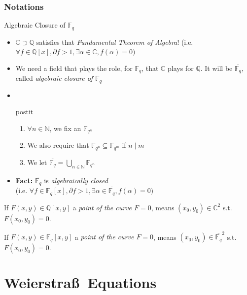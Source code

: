 \documentclass[10pt,handout]{beamer} %
\newcommand{\Q}{\mathbb Q}
\newcommand{\N}{\mathbb N}
\newcommand{\F}{\mathbb F}
\newcommand{\C}{\mathbb C}
\theoremstyle{definition}
\begin{document}
\begin{frame}[label=current]
\frametitle{Notations}
%
 \begin{block}{Algebraic Closure of $\F_q$}\pause
 \begin{itemize}[<+-| alert@+>] %
  \item $\C\supset\Q$ satisfies that \emph{Fundamental Theorem of Algebra}! (i.e. $\forall f\in\Q[x], \partial f>1, \exists\alpha\in\C,
 f(\alpha)=0)$
  \item We need a field that plays the role, for $\F_q$, that $\C$ plays for $\Q$. It will be $\overline{\F_q}$, called
\emph{algebraic closure of $\F_q$}
 \item[] \ \hfil 
 \begin{beamercolorbox}[rounded=true,shadow=true,wd=6.5cm]{postit}
         \begin{enumerate}
          \item $\forall n\in\N$, we fix an $\F_{q^n}$
          \item We also require that $\F_{q^n}\subseteq\F_{q^m}$ if $n\mid m$
          \item We let $\overline{\F_q}=\displaystyle\bigcup_{n\in\N}\F_{q^n}$
         \end{enumerate}
\end{beamercolorbox}
 \item
  \textbf{Fact:} $\overline{\F_q}$ is \emph{algebraically closed}\\ (i.e. $\forall f\in\F_q[x], \partial f>1, \exists\alpha\in\overline{\F_q},
 f(\alpha)=0)$
 \end{itemize}
 \end{block}

If $F(x,y)\in\Q[x,y]$ a \emph{point of the curve $F=0$}, means $(x_0,y_0)\in\C^2$ s.t.
$F(x_0,y_0)=0$. \pause

If $F(x,y)\in\F_q[x,y]$ a \emph{point of the curve $F=0$}, means $(x_0,y_0)\in\overline{\F_q}^2$ s.t.
$F(x_0,y_0)=0$.
\end{frame}


\section{Weierstra\ss\ Equations}
\end{document}
